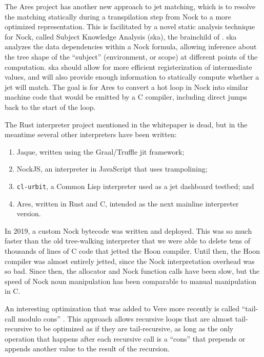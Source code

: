 \documentclass[twoside]{article}
\begin{document}
The Ares project has another new approach to jet matching, which is to resolve the matching statically during a transpilation step from Nock to a more optimized representation.  This is facilitated by a novel static analysis technique for Nock, called Subject Knowledge Analysis ({\sc ska}), the brainchild of .  {\sc ska} analyzes the data dependencies within a Nock formula, allowing inference about the tree shape of the ``subject'' (environment, or scope) at different points of the computation.  {\sc ska} should allow for more efficient registerization of intermediate values, and will also provide enough information to statically compute whether a jet will match.  The goal is for Ares to convert a hot loop in Nock into similar machine code that would be emitted by a C compiler, including direct jumps back to the start of the loop.

The Rust interpreter project mentioned in the whitepaper is dead, but in the meantime several other interpreters have been written:

\begin{enumerate}
  \item  Jaque, written using the Graal/Truffle {\sc jit} framework;
  \item  NockJS, an interpreter in JavaScript that uses trampolining;
  \item  \texttt{cl-urbit}, a Common Lisp interpreter used as a jet dashboard testbed; and
  \item  Ares, written in Rust and C, intended as the next mainline interpreter version.
\end{enumerate}

In 2019, a custom Nock bytecode was written and deployed.  This was so much faster than the old tree-walking interpreter that we were able to delete tens of thousands of lines of C code that jetted the Hoon compiler.  Until then, the Hoon compiler was almost entirely jetted, since the Nock interpretation overhead was so bad.  Since then, the allocator and Nock function calls have been slow, but the speed of Nock noun manipulation has been comparable to manual manipulation in C.

An interesting optimization that was added to Vere more recently is called ``tail-call modulo cons'' \citep{Leijen2023}.  This approach allows recursive loops that are almost tail-recursive to be optimized as if they are tail-recursive, as long as the only operation that happens after each recursive call is a ``cons'' that prepends or appends another value to the result of the recursion.
\end{document}
